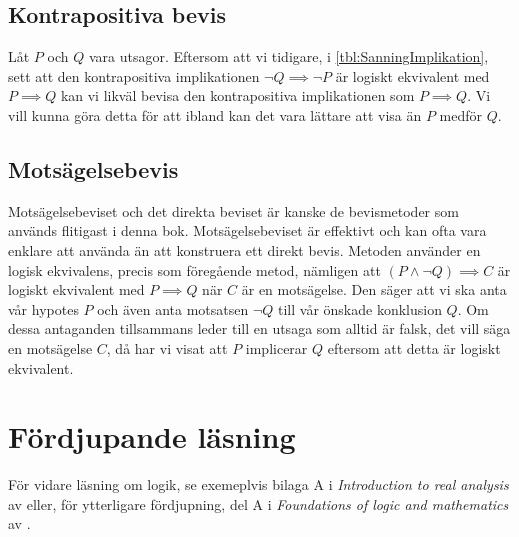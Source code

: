 \subsection{Kontrapositiva bevis}

Låt \(P\) och \(Q\) vara utsagor.
Eftersom att vi tidigare, i \cref{tbl:SanningImplikation}, sett att den
kontrapositiva implikationen \(\lnot Q\implies\lnot 
  P\) är logiskt ekvivalent
med \(P\implies Q\) kan vi likväl bevisa den kontrapositiva implikationen som
\(P\implies Q\).
Vi vill kunna göra detta för att ibland kan det vara lättare att visa än \(P\) 
medför \(Q\).

\subsection{Motsägelsebevis}

Motsägelsebeviset och det direkta beviset är kanske de 
bevismetoder som används flitigast i denna bok.
Motsägelsebeviset är effektivt och kan ofta vara enklare att använda än att
konstruera ett direkt bevis.
Metoden använder en logisk ekvivalens, precis som föregående metod, nämligen att
\((P\land\lnot Q)\implies C\) är logiskt ekvivalent med \(P\implies Q\) när
\(C\) är en motsägelse.
Den säger att vi ska anta vår hypotes \(P\) och även anta motsatsen
\(\lnot Q\) till vår önskade konklusion \(Q\).
Om dessa antaganden tillsammans leder till en utsaga som alltid är falsk, det
vill säga en motsägelse \(C\), då har vi visat att \(P\) implicerar \(Q\)
eftersom att detta är logiskt ekvivalent.


\section{Fördjupande läsning}

För vidare läsning om logik, se exemeplvis bilaga A i \emph{Introduction to 
real analysis} av \citet{Bartle2000itr} eller, för ytterligare fördjupning, del 
A i \emph{Foundations of logic and mathematics} av 
\citet{nievergelt2002foundations}.

